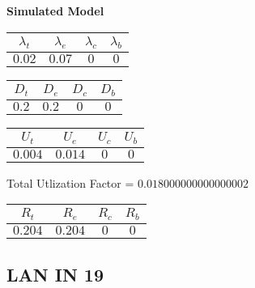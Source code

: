 \documentclass{article}
\begin{document}
\begin{minipage}{0.5\textwidth}
\centering	\textbf{Simulated Model}
\begin{table}[H]
\centering
\begin{tabular}{@{}cccc@{}}
\toprule
$\lambda_t$ & $\lambda_e$ & $\lambda_c$ & $\lambda_b$\\
\midrule
$0.02$ & $0.07$ & $0$ & $0$\\
\bottomrule
\end{tabular}
\end{table}
\begin{table}[H]
\centering
\begin{tabular}{@{}cccc@{}}
\toprule
$D_t$ & $D_e$ & $D_c$ & $D_b$\\
\midrule
$0.2$ & $0.2$ & $0$ & $0$\\
\bottomrule
\end{tabular}
\end{table}\begin{table}[H]
\centering
\begin{tabular}{@{}cccc@{}}
\toprule
$U_t$ & $U_e$ & $U_c$ & $U_b$\\
\midrule
$0.004$ & $0.014$ & $0$ & $0$\\
\bottomrule
\end{tabular}
\end{table}
\centering Total Utlization Factor = $0.018000000000000002$
\begin{table}[H]
\centering
\begin{tabular}{@{}cccc@{}}
\toprule
$R_t$ & $R_e$ & $R_c$ & $R_b$\\
\midrule
$0.204$ & $0.204$ & $0$ & $0$\\
\bottomrule
\end{tabular}
\end{table}
\end{minipage}\subsection{LAN IN 19}
\end{document}
